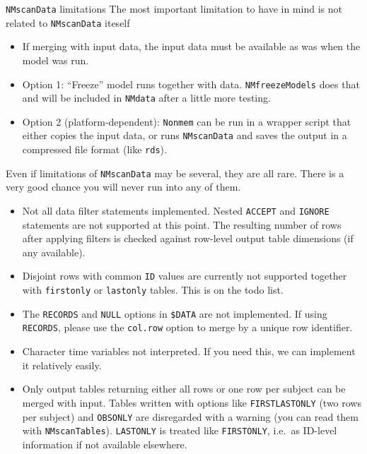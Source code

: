 \documentclass[
  8pt,
  ignorenonframetext,
  aspectratio=169]{beamer}
\providecommand{\tightlist}{%
  \setlength{\itemsep}{0pt}\setlength{\parskip}{0pt}}
\begin{document}
\begin{frame}[fragile]{\texttt{NMscanData} limitations}
\protect\hypertarget{nmscandata-limitations}{}
The most important limitation to have in mind is not related to
\texttt{NMscanData} iteself

\begin{itemize}
\tightlist
\item
  If merging with input data, the input data must be available as was
  when the model was run.
\item
  Option 1: ``Freeze'' model runs together with data.
  \texttt{NMfreezeModels} does that and will be included in
  \texttt{NMdata} after a little more testing.
\item
  Option 2 (platform-dependent): \texttt{Nonmem} can be run in a wrapper
  script that either copies the input data, or runs \texttt{NMscanData}
  and saves the output in a compressed file format (like \texttt{rds}).
\end{itemize}

Even if limitations of \texttt{NMscanData} may be several, they are all
rare. There is a very good chance you will never run into any of them.

\begin{itemize}
\item
  Not all data filter statements implemented. Nested \texttt{ACCEPT} and
  \texttt{IGNORE} statements are not supported at this point. The
  resulting number of rows after applying filters is checked against
  row-level output table dimensions (if any available).
\item
  Disjoint rows with common \texttt{ID} values are currently not
  supported together with \texttt{firstonly} or \texttt{lastonly}
  tables. This is on the todo list.
\item
  The \texttt{RECORDS} and \texttt{NULL} options in \texttt{\$DATA} are
  not implemented. If using \texttt{RECORDS}, please use the
  \texttt{col.row} option to merge by a unique row identifier.
\item
  Character time variables not interpreted. If you need this, we can
  implement it relatively easily.
\item
  Only output tables returning either all rows or one row per subject
  can be merged with input. Tables written with options like
  \texttt{FIRSTLASTONLY} (two rows per subject) and \texttt{OBSONLY} are
  disregarded with a warning (you can read them with
  \texttt{NMscanTables}). \texttt{LASTONLY} is treated like
  \texttt{FIRSTONLY}, i.e.~as ID-level information if not available
  elsewhere.
\end{itemize}
\end{frame}
\end{document}
